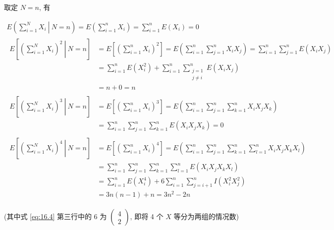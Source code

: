 \documentclass[boxes]{homework}
\begin{document}
\begin{solution}
    取定 $N=n$, 有

    \begin{gather}
            E \left(\left.\sum_{i=1}^N X_i\ \right\vert\ N = n\right) = E \left(\sum_{i=1}^n X_i\right)
            = \sum_{i=1}^n E(X_i) = 0
        \\
        \begin{aligned}
            E \left[\left.\left(\sum_{i=1}^N X_i\right)^2\ \right\vert\ N = n\right] &= E \left[\left(\sum_{i=1}^n X_i\right)^2\right]=E\left(\sum_{i=1}^n\sum_{j=1}^nX_iX_j\right) = \sum_{i=1}^n\sum_{j=1}^n E(X_iX_j) \\
            &= \sum_{i=1}^n E(X_i^2)+\sum_{i=1}^n\sum_{\substack{j=1\\j\neq i}}^nE(X_iX_j)\\
            &= n + 0 = n
        \end{aligned}
    \end{gather}
    \begin{gather}
        \begin{aligned}
            E \left[\left.\left(\sum_{i=1}^N X_i\right)^3\ \right\vert\ N = n\right] &= E \left[\left(\sum_{i=1}^n X_i\right)^3\right]=E\left(\sum_{i=1}^n\sum_{j=1}^n\sum_{k=1}^nX_iX_jX_k\right)\\
            &= \sum_{i=1}^n\sum_{j=1}^n\sum_{k=1}^n E(X_iX_jX_k) = 0
        \end{aligned}
        \\
        \begin{aligned}
            \label{eq:16.4}
            E \left[\left.\left(\sum_{i=1}^N X_i\right)^4\ \right\vert\ N = n\right] &= E \left[\left(\sum_{i=1}^n X_i\right)^4\right]=E\left(\sum_{i=1}^n\sum_{j=1}^n\sum_{k=1}^n\sum_{l=1}^nX_iX_jX_kX_l\right)\\
            &= \sum_{i=1}^n\sum_{j=1}^n\sum_{k=1}^n\sum_{l=1}^nE(X_iX_jX_kX_l)\\
            &= \sum_{i=1}^n E(X_i^4) + 6\sum_{i=1}^n\sum_{j=i+1}^n I(X_i^2X_j^2)\\
            &= 3n(n-1)+n=3n^2-2n
        \end{aligned}
    \end{gather}
    
    (其中式 \ref{eq:16.4} 第三行中的 6 为 $\displaystyle\begin{pmatrix}
        4\\2
    \end{pmatrix}$, 即将 4 个 $X$ 等分为两组的情况数)


\end{solution}
\end{document}
